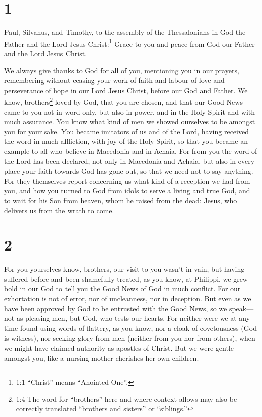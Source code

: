 \hypertarget{section}{%
\section{1}\label{section}}

 Paul, Silvanus, and Timothy, to the assembly of the
Thessalonians in God the Father and the Lord Jesus Christ:\footnote{1:1
  ``Christ'' means ``Anointed One''.} Grace to you and peace from God
our Father and the Lord Jesus Christ.

 We always give thanks to God for all of you, mentioning you
in our prayers,  remembering without ceasing your work of
faith and labour of love and perseverance of hope in our Lord Jesus
Christ, before our God and Father.  We know,
brothers\footnote{1:4 The word for ``brothers'' here and where context
  allows may also be correctly translated ``brothers and sisters'' or
  ``siblings.''} loved by God, that you are chosen,  and
that our Good News came to you not in word only, but also in power, and
in the Holy Spirit and with much assurance. You know what kind of men we
showed ourselves to be amongst you for your sake.  You
became imitators of us and of the Lord, having received the word in much
affliction, with joy of the Holy Spirit,  so that you became
an example to all who believe in Macedonia and in Achaia. 
For from you the word of the Lord has been declared, not only in
Macedonia and Achaia, but also in every place your faith towards God has
gone out, so that we need not to say anything.  For they
themselves report concerning us what kind of a reception we had from
you, and how you turned to God from idols to serve a living and true
God,  and to wait for his Son from heaven, whom he raised
from the dead: Jesus, who delivers us from the wrath to come.

\hypertarget{section-1}{%
\section{2}\label{section-1}}

 For you yourselves know, brothers, our visit to you wasn't
in vain,  but having suffered before and been shamefully
treated, as you know, at Philippi, we grew bold in our God to tell you
the Good News of God in much conflict.  For our exhortation
is not of error, nor of uncleanness, nor in deception.  But
even as we have been approved by God to be entrusted with the Good News,
so we speak---not as pleasing men, but God, who tests our hearts.
 For neither were we at any time found using words of
flattery, as you know, nor a cloak of covetousness (God is witness),
 nor seeking glory from men (neither from you nor from
others), when we might have claimed authority as apostles of Christ.
 But we were gentle amongst you, like a nursing mother
cherishes her own children.

